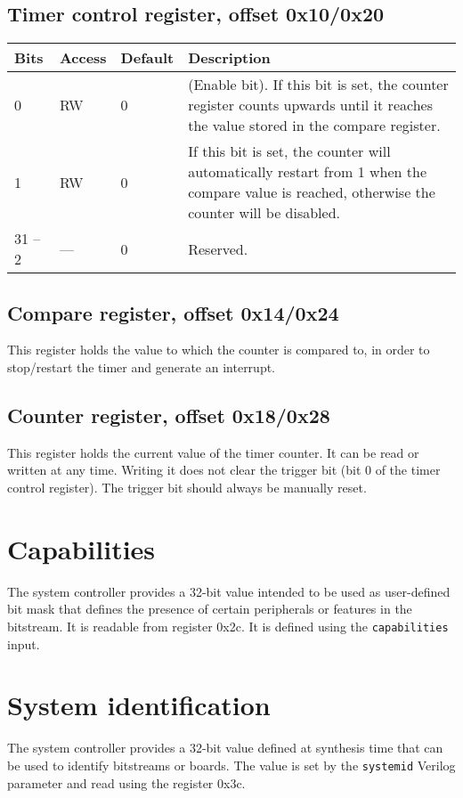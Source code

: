\documentclass[a4paper,11pt]{article}
\begin{document}
\subsection{Timer control register, offset 0x10/0x20}
\begin{tabularx}{\textwidth}{|l|l|l|X|}
\hline
\bf Bits & \bf Access & \bf Default & \bf Description \\
\hline
0 & RW & 0 & (Enable bit). If this bit is set, the counter register counts upwards until it reaches the value stored in the compare register. \\
\hline
1 & RW & 0 & If this bit is set, the counter will automatically restart from 1 when the compare value is reached, otherwise the counter will be disabled. \\
\hline
31 -- 2 & --- & 0 & Reserved. \\
\hline
\end{tabularx}

\subsection{Compare register, offset 0x14/0x24}
This register holds the value to which the counter is compared to, in order to stop/restart the timer and generate an interrupt.

\subsection{Counter register, offset 0x18/0x28}
This register holds the current value of the timer counter. It can be read or written at any time.
Writing it does not clear the trigger bit (bit 0 of the timer control register). The trigger bit should always be manually reset.

\section{Capabilities}
The system controller provides a 32-bit value intended to be used as user-defined bit mask that defines the presence of certain peripherals or features in the bitstream. It is readable from register 0x2c. It is defined  using the \verb!capabilities! input.

\section{System identification}
The system controller provides a 32-bit value defined at synthesis time that can be used to identify bitstreams or boards. The value is set by the \verb!systemid! Verilog parameter and read using the register 0x3c.
\end{document}
